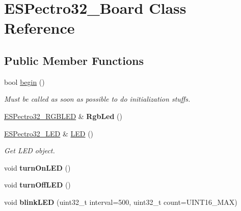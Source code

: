 \hypertarget{classESPectro32__Board}{\section{E\-S\-Pectro32\-\_\-\-Board Class Reference}
\label{classESPectro32__Board}
}
\subsection*{Public Member Functions}
\begin{DoxyCompactItemize}
\item 
\hypertarget{classESPectro32__Board_ab30bdfe90355eebed94079825edb9074}{bool \hyperlink{classESPectro32__Board_ab30bdfe90355eebed94079825edb9074}{begin} ()}\label{classESPectro32__Board_ab30bdfe90355eebed94079825edb9074}

\begin{DoxyCompactList}\small\item\em Must be called as soon as possible to do initialization stuffs. \end{DoxyCompactList}\item 
\hypertarget{classESPectro32__Board_a6323282821fc82e3464c9f6d71694ec2}{\hyperlink{classESPectro32__RGBLED}{E\-S\-Pectro32\-\_\-\-R\-G\-B\-L\-E\-D} \& {\bfseries Rgb\-Led} ()}\label{classESPectro32__Board_a6323282821fc82e3464c9f6d71694ec2}

\item 
\hyperlink{classESPectro32__LED}{E\-S\-Pectro32\-\_\-\-L\-E\-D} \& \hyperlink{classESPectro32__Board_a400d22c0e4bd91c67c79dd2a3d97949b}{L\-E\-D} ()
\begin{DoxyCompactList}\small\item\em Get L\-E\-D object. \end{DoxyCompactList}\item 
\hypertarget{classESPectro32__Board_a200ca72df0774755f3a2f4ea102939f1}{void {\bfseries turn\-On\-L\-E\-D} ()}\label{classESPectro32__Board_a200ca72df0774755f3a2f4ea102939f1}

\item 
\hypertarget{classESPectro32__Board_aad62eaa7b136b105e89631b488cc77ae}{void {\bfseries turn\-Off\-L\-E\-D} ()}\label{classESPectro32__Board_aad62eaa7b136b105e89631b488cc77ae}

\item 
\hypertarget{classESPectro32__Board_ab592b38643de929709b44c8244aee776}{void {\bfseries blink\-L\-E\-D} (uint32\-\_\-t interval=500, uint32\-\_\-t count=U\-I\-N\-T16\-\_\-\-M\-A\-X)}\label{classESPectro32__Board_ab592b38643de929709b44c8244aee776}


\end{DoxyCompactItemize}
